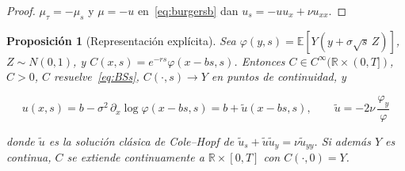 \documentclass[11pt,letterpaper]{article}
\theoremstyle{plain}
\newtheorem{proposicion}[theorem]{Proposición}
\theoremstyle{definition}
\theoremstyle{remark}
\numberwithin{equation}{section}
\newcommand{\R}{\mathbb{R}}
\newcommand{\E}{\mathbb{E}}
\begin{document}
	\begin{proof}
		\(\mu_\tau=-\mu_s\) y \(\mu=-u\) en~\eqref{eq:burgersb} dan \(u_s=-uu_x+\nu u_{xx}\).
		
	\end{proof}
	
	\begin{proposicion}[Representación explícita]\label{prop:rep}
		Sea \(\varphi(y,s)=\E\left[Y(y+\sigma\sqrt{s}\,Z)\right]\), \(Z\sim N(0,1)\), y \(C(x,s)=e^{-rs}\varphi(x-bs,s)\). Entonces \(C\in C^\infty(\R\times(0,T])\), \(C>0\), \(C\) resuelve~\eqref{eq:BSs}, \(C(\cdot,s)\to Y\) en puntos de continuidad, y
		
		\begin{equation}\label{eq:uexplicit}
			u(x,s)=b-\sigma^2\,\partial_x\log\varphi(x-bs,s)=b+\tilde u(x-bs,s),\qquad \tilde u=-2\nu\,\frac{\varphi_y}{\varphi}
		\end{equation}
		
		donde \(\tilde u\) es la solución clásica de Cole--Hopf de \(\tilde u_s+\tilde u\tilde u_y=\nu\tilde u_{yy}\). Si además \(Y\) es continua, \(C\) se extiende continuamente a \(\R\times[0,T]\) con \(C(\cdot,0)=Y\).
	\end{proposicion}
	
\end{document}

